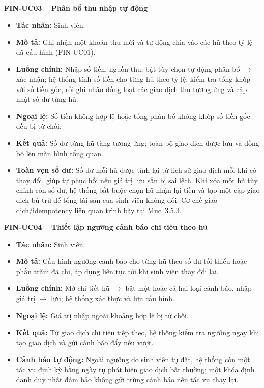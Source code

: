 \noindent\textbf{FIN-UC03 -- Phân bổ thu nhập tự động}
\begin{itemize}
    \item \textbf{Tác nhân:} Sinh viên.
    \item \textbf{Mô tả:} Ghi nhận một khoản thu mới và tự động chia vào các hũ theo tỷ lệ đã cấu hình (FIN-UC01).
    \item \textbf{Luồng chính:} Nhập số tiền, nguồn thu, bật tùy chọn tự động phân bổ $\rightarrow$ xác nhận; hệ thống tính số tiền cho từng hũ theo tỷ lệ, kiểm tra tổng khớp với số tiền gốc, rồi ghi nhận đồng loạt các giao dịch thu tương ứng và cập nhật số dư từng hũ.
    \item \textbf{Ngoại lệ:} Số tiền không hợp lệ hoặc tổng phân bổ không khớp số tiền gốc đều bị từ chối.
    \item \textbf{Kết quả:} Số dư từng hũ tăng tương ứng; toàn bộ giao dịch được lưu và đồng bộ lên màn hình tổng quan.
    \item \textbf{Toàn vẹn số dư:} Số dư mỗi hũ được tính lại từ lịch sử giao dịch mỗi khi có thay đổi, giúp tự phục hồi nếu giá trị lưu sẵn bị sai lệch. Khi xóa một hũ tùy chỉnh còn số dư, hệ thống bắt buộc chọn hũ nhận lại tiền và tạo một cặp giao dịch bù trừ để tổng tài sản của sinh viên không đổi. Cơ chế giao dịch/idempotency liên quan trình bày tại Mục~3.5.3.
\end{itemize}

\noindent\textbf{FIN-UC04 -- Thiết lập ngưỡng cảnh báo chi tiêu theo hũ}
\begin{itemize}
    \item \textbf{Tác nhân:} Sinh viên.
    \item \textbf{Mô tả:} Cấu hình ngưỡng cảnh báo cho từng hũ theo số dư tối thiểu hoặc phần trăm đã chi, áp dụng liên tục tới khi sinh viên thay đổi lại.
    \item \textbf{Luồng chính:} Mở chi tiết hũ $\rightarrow$ bật một hoặc cả hai loại cảnh báo, nhập giá trị $\rightarrow$ lưu; hệ thống xác thực và lưu cấu hình.
    \item \textbf{Ngoại lệ:} Giá trị nhập ngoài khoảng hợp lệ bị từ chối.
    \item \textbf{Kết quả:} Từ giao dịch chi tiêu tiếp theo, hệ thống kiểm tra ngưỡng ngay khi tạo giao dịch và gửi cảnh báo đẩy nếu vượt.
    \item \textbf{Cảnh báo tự động:} Ngoài ngưỡng do sinh viên tự đặt, hệ thống còn một tác vụ định kỳ hằng ngày tự phát hiện giao dịch bất thường; một khóa định danh duy nhất đảm bảo không gửi trùng cảnh báo nếu tác vụ chạy lại.
\end{itemize}


